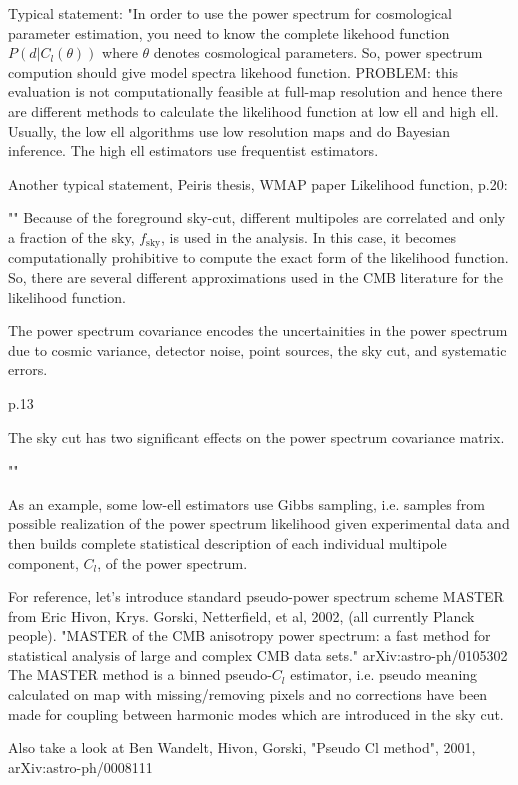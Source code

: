\documentclass[a4paper, 11pt]{article}
\begin{document}
Typical statement: "In order to use the power spectrum for cosmological parameter estimation, you need to know the complete likehood function $P(d | C_l(\theta))$ where $\theta$ denotes cosmological parameters. So, power spectrum compution should give model spectra likehood function. PROBLEM: this evaluation is not computationally feasible at full-map resolution and hence there are different methods to calculate the likelihood function at low ell and high ell. Usually, the low ell algorithms use low resolution maps and do Bayesian inference. The high ell estimators use  frequentist estimators. 

Another typical statement, Peiris thesis, WMAP paper Likelihood function, p.20:

""
Because of the foreground sky-cut, different multipoles are correlated and only a fraction of the sky, $f_{\text{sky}}$, is used in the analysis. In this case, it becomes computationally prohibitive to compute the exact form of the likelihood function. So, there are several different approximations used in the CMB literature for the likelihood function. 

The power spectrum covariance encodes the uncertainities in the power spectrum due to cosmic variance, detector noise, point sources, the sky cut, and systematic errors. 

p.13

The sky cut has two significant effects on the power spectrum covariance matrix. 


""


As an example, some low-ell estimators use Gibbs sampling, i.e. samples from possible realization of the power spectrum likelihood given experimental data and then builds complete statistical description of each individual multipole component, $C_l$, of the power spectrum. 

For reference, let's introduce standard pseudo-power spectrum scheme MASTER from Eric Hivon, Krys. Gorski, Netterfield, et al, 2002, (all currently Planck people). "MASTER of the CMB anisotropy power spectrum: a fast method for statistical analysis of large and complex CMB data sets." arXiv:astro-ph/0105302
The MASTER method is a binned pseudo-$C_l$ estimator, i.e. pseudo meaning calculated on map with missing/removing pixels and no corrections have been made for coupling between harmonic modes which are introduced in the sky cut. 

Also take a look at Ben Wandelt, Hivon, Gorski, "Pseudo Cl method", 2001, arXiv:astro-ph/0008111
\end{document}
